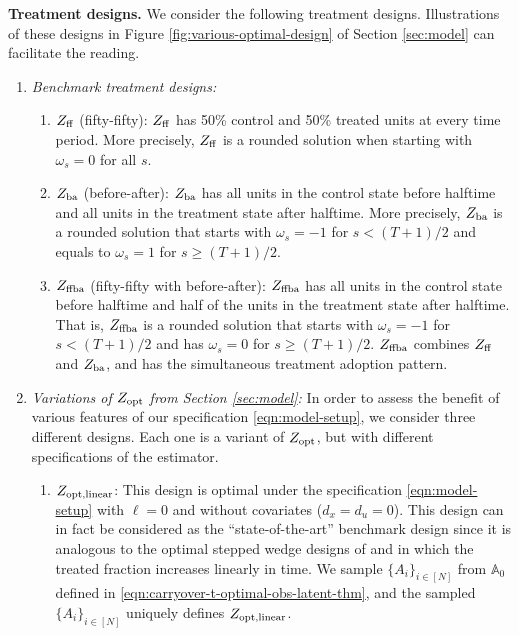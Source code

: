 	{\bf Treatment designs.}
	We consider the following treatment designs. Illustrations of these designs in Figure \ref{fig:various-optimal-design} of Section \ref{sec:model} can facilitate the reading.
	\begin{enumerate}
		\item \emph{Benchmark treatment designs:}
		\begin{enumerate}
		\item $Z_{\mathrm{ff}}$ (fifty-fifty): $Z_{\mathrm{ff}}$ has 50\% control and 50\% treated units at every time period. More precisely, $Z_{\mathrm{ff}}$ is a rounded solution when starting with $\omega_s = 0$ for all $s$.
			\item $Z_{\mathrm{ba}}$ (before-after): $Z_{\mathrm{ba}}$ has all units in the control state before halftime and all units in the treatment state after halftime. More precisely, $Z_{\mathrm{ba}}$ is a rounded solution that starts with $\omega_s = -1$ for $s < (T+1)/2$ and equals to $\omega_s = 1$ for $s \geq (T+1)/2$.
			\item $Z_{\mathrm{ffba}}$ (fifty-fifty with before-after): $Z_{\mathrm{ffba}}$ has all units in the control state before halftime and half of the units in the treatment state after halftime. That is, $Z_{\mathrm{ffba}}$ is a rounded solution that starts with $\omega_s = -1$ for $s < (T+1)/2$ and has $\omega_s = 0$ for $s \geq (T+1)/2$. $Z_{\mathrm{ffba}}$ combines $Z_{\mathrm{ff}}$ and $Z_{\mathrm{ba}}$, and has the simultaneous treatment adoption pattern.
		\end{enumerate}
		
		\item \emph{Variations of $Z_{\textnormal{opt}}$ from Section \ref{sec:model}:} In order to assess the benefit of various features of our specification \eqref{eqn:model-setup}, we consider three different designs. Each one is a variant of $Z_{\textnormal{opt}}$, but with different specifications of the estimator.
		\begin{enumerate}
				\item $Z_{\textnormal{opt}, \mathrm{linear}}$:
				This design is optimal under the specification \eqref{eqn:model-setup} with $\ell = 0$ and without covariates ($d_x = d_u = 0$). This design can in fact be considered as the ``state-of-the-art'' benchmark design since it is analogous to the optimal stepped wedge designs of \cite{hemming2015stepped} and \cite{li2018optimal} in which the treated fraction increases linearly in time. We sample $\{A_i\}_{i \in [N]}$ from $\mathbb{A}_0$ defined in \eqref{eqn:carryover-t-optimal-obs-latent-thm}, and the sampled $\{A_i\}_{i \in [N]}$ uniquely defines $Z_{\textnormal{opt}, \mathrm{linear}}$.
				

\end{enumerate}
\end{enumerate}
